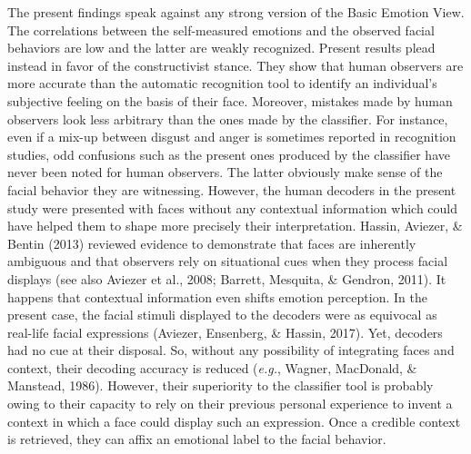 \documentclass[
  english,
  doc]{apa7}
\begin{document}
The present findings speak against any strong version of the Basic Emotion View. The correlations between the self-measured emotions and the observed facial behaviors are low and the latter are weakly recognized. Present results plead instead in favor of the constructivist stance. They show that human observers are more accurate than the automatic recognition tool to identify an individual's subjective feeling on the basis of their face. Moreover, mistakes made by human observers look less arbitrary than the ones made by the classifier. For instance, even if a mix-up between disgust and anger is sometimes reported in recognition studies, odd confusions such as the present ones produced by the classifier have never been noted for human observers. The latter obviously make sense of the facial behavior they are witnessing. However, the human decoders in the present study were presented with faces without any contextual information which could have helped them to shape more precisely their interpretation. Hassin, Aviezer, \& Bentin (2013) reviewed evidence to demonstrate that faces are inherently ambiguous and that observers rely on situational cues when they process facial displays (see also Aviezer et al., 2008; Barrett, Mesquita, \& Gendron, 2011). It happens that contextual information even shifts emotion perception. In the present case, the facial stimuli displayed to the decoders were as equivocal as real-life facial expressions (Aviezer, Ensenberg, \& Hassin, 2017). Yet, decoders had no cue at their disposal. So, without any possibility of integrating faces and context, their decoding accuracy is reduced (\emph{e.g.}, Wagner, MacDonald, \& Manstead, 1986). However, their superiority to the classifier tool is probably owing to their capacity to rely on their previous personal experience to invent a context in which a face could display such an expression. Once a credible context is retrieved, they can affix an emotional label to the facial behavior.
\end{document}

